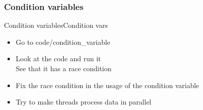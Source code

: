 \begin{frame}[fragile]
  \frametitle{Condition variables}
  \begin{exerciseWithShortcut}{Condition variables}{Condition vars}
    \begin{itemize}
    \item Go to code/condition\_variable
    \item Look at the code and run it\\
      See that it has a race condition
    \item Fix the race condition in the usage of the condition variable
    \item Try to make threads process data in parallel
    \end{itemize}
  \end{exerciseWithShortcut}
\end{frame}

